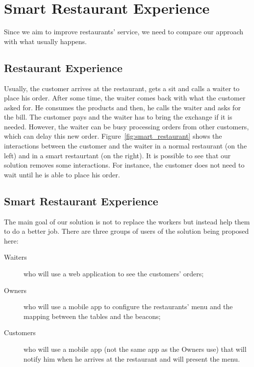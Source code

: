 
\section{Smart Restaurant Experience}
\label{sec:smart_restaurant_experience}

Since we aim to improve restaurants' service, we need to compare our approach
with what usually happens.
\subsection{Restaurant Experience}
\label{sub:restaurant_experience}
Usually, the customer arrives at the restaurant, gets a sit and calls a waiter
to place his order. After some time, the waiter comes back with what
the customer asked for. He consumes the products and then, he calls the
waiter and asks for the bill. The customer pays and the waiter has to bring
the exchange if it is needed.
However, the waiter can be busy processing orders
from other customers, which can delay this new order.
Figure~\ref{fig:smart_restaurant} shows the interactions between the
customer and the waiter in a normal restaurant (on the left) and in
a smart restaurtant (on the right). It is possible to see that our
solution removes some interactions. For instance, the customer does not
need to wait until he is able to place his order.

\subsection{Smart Restaurant Experience}
\label{sub:smart_restaurant_experience}

The main goal of our solution is not to replace the workers
but instead help them to do a
better job.
There are three groups of users of the solution being proposed here:

\begin{description}
  \item[Waiters] who will use a web application to see the customers'
  orders;
  \item[Owners] who will use a mobile app to configure the
  restaurants' menu and the mapping between the tables and the beacons;
  \item[Customers] who will use a mobile app (not the same app as the
  Owners use) that will notify him when he arrives at the restaurant and
  will present the menu.
\end{description}

